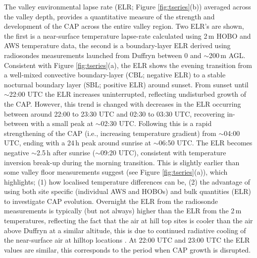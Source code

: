 \documentclass[times]{qjrms4}
\begin{document}
The valley environmental lapse rate (ELR; Figure \ref{fig:tseries}(b)) averaged across the valley depth, provides a quantitative measure of the strength and development of the CAP across the entire valley region. Two ELR's are shown, the first is a near-surface temperature lapse-rate calculated using 2$\,\mbox{m}$ HOBO and AWS temperature data, the second is a boundary-layer ELR derived using radiosondes measurements launched from Duffryn between 0 and $\sim$200$\,\mbox{m}$ AGL. Consistent with Figure \ref{fig:tseries}(a), the ELR shows the evening transition from a well-mixed convective boundary-layer (CBL; negative ELR) to a stable nocturnal boundary layer (SBL; positive ELR) around sunset. From sunset until $\sim$22:00 UTC the ELR increases uninterrupted, reflecting undisturbed growth of the CAP. However, this trend is changed with decreases in the ELR occurring between around 22:00 to 23:30 UTC and 02:30 to 03:30 UTC, recovering in-between with a small peak at $\sim$02:30 UTC. Following this is a rapid strengthening of the CAP (i.e., increasing temperature gradient) from $\sim$04:00 UTC, ending with a 24$\,\mbox{h}$ peak around sunrise at $\sim$06:50 UTC. The ELR becomes negative $\sim$2.5$\,\mbox{h}$ after sunrise ($\sim$09:20 UTC), consistent with temperature inversion break-up during the morning transition. This is slightly earlier than some valley floor measurements suggest (see Figure \ref{fig:tseries}(a)), which highlights; (1) how localised temperature differences can be, (2) the advantage of using both site specific (individual AWS and HOBOs) and bulk quantities (ELR) to investigate CAP evolution. Overnight the ELR from the radiosonde measurements is typically (but not always) higher than the ELR from the 2$\,\mbox{m}$ temperatures, reflecting the fact that the air at hill top sites is cooler than the air above Duffryn at a similar altitude, this is due to continued radiative cooling of the near-surface air at hilltop locations \citep{Vosper2013narrow}. At 22:00 UTC and 23:00 UTC the ELR values are similar, this corresponds to the period when CAP growth is disrupted.
\end{document}
